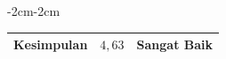 \begin{enumerate}
\begin{table}[H]
\begin{adjustwidth}{-2cm}{-2cm}
\begin{tabular}{|l|c|c|c|l|}
                \multicolumn{3}{|c|}{Kesimpulan} & \(4{,}63\) & Sangat Baik\\
                \hline
            \end{tabular}
        \end{adjustwidth}
    \end{table}


\end{enumerate}

